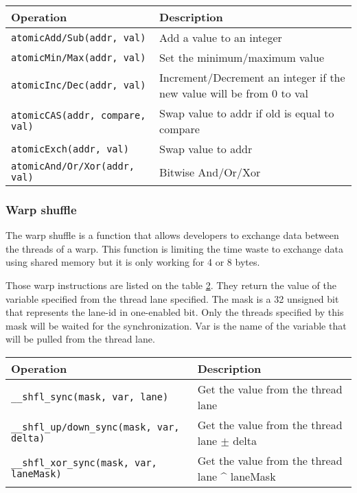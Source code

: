\begin{table}[ht]
    \centering
    \begin{tabular}{|m{}|m{}|}
        \hline
        \textbf{Operation} & \textbf{Description} \\
        \hline
        \texttt{atomicAdd/Sub(addr, val)} & Add a value to an integer \\
        \hline
        \texttt{atomicMin/Max(addr, val)} & Set the minimum/maximum value \\
        \hline
        \texttt{atomicInc/Dec(addr, val)} & Increment/Decrement an integer if the new value will be from 0 to val\\
        \hline
        \texttt{atomicCAS(addr, compare, val)} & Swap value to addr if old is equal to compare\\
        \hline
        \texttt{atomicExch(addr, val)} & Swap value to addr \\
        \hline
        \texttt{atomicAnd/Or/Xor(addr, val)} & Bitwise And/Or/Xor \\
        \hline
    \end{tabular}
    \label{tab:analyze:cuda:synchronization:atomic}
\end{table}

\subsubsection{Warp shuffle}
\label{ch:analyze:cuda:synchronization:warp-shuffle}

The warp shuffle is a function that allows developers to exchange data between the threads
of a warp.
This function is limiting the time waste to exchange data using shared memory
but it is only working for 4 or 8 bytes.

Those warp instructions are listed on the table \ref{tab:analyze:cuda:synchronization:warp-shuffle}.
They return the value of the variable specified from the thread lane specified.
The mask is a 32 unsigned bit that represents the lane-id in one-enabled bit.
Only the threads specified by this mask will be waited for the synchronization.
Var is the name of the variable that will be pulled from the thread lane.

\begin{table}[ht]
    \centering
    \begin{tabular}{|m{}|m{}|}
        \hline
        \textbf{Operation} & \textbf{Description} \\
        \hline
        \texttt{\_\_shfl\_sync(mask, var, lane)} & Get the value from the thread lane\\
        \hline
        \texttt{\_\_shfl\_up/down\_sync(mask, var, delta)} & Get the value from the thread lane $\pm$ delta\\
        \hline
        \texttt{\_\_shfl\_xor\_sync(mask, var, laneMask)} & Get the value from the thread lane \^{} laneMask\\
        \hline
    \end{tabular}
    \label{tab:analyze:cuda:synchronization:warp-shuffle}
\end{table}


